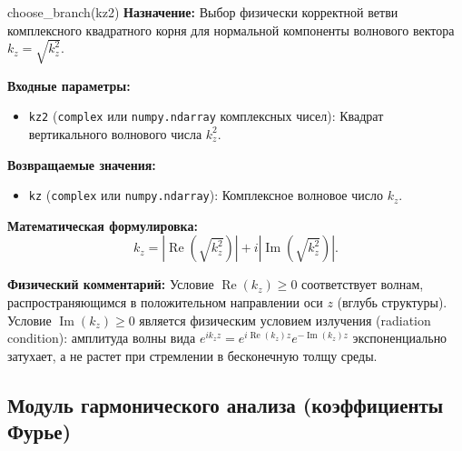 \documentclass[a4paper,11pt]{article}
\begin{document}
\begin{funcbox}{choose\_branch(kz2)}
\textbf{Назначение:} Выбор физически корректной ветви комплексного квадратного корня для нормальной компоненты волнового вектора $k_z = \sqrt{k_z^2}$.

\textbf{Входные параметры:}
\begin{itemize}
    \item \texttt{kz2} (\texttt{complex} или \texttt{numpy.ndarray} комплексных чисел): Квадрат вертикального волнового числа $k_z^2$.
\end{itemize}

\textbf{Возвращаемые значения:}
\begin{itemize}
    \item \texttt{kz} (\texttt{complex} или \texttt{numpy.ndarray}): Комплексное волновое число $k_z$.
\end{itemize}

\textbf{Математическая формулировка:}
\begin{equation*}
k_z = |\operatorname{Re}(\sqrt{k_z^2})| + i |\operatorname{Im}(\sqrt{k_z^2})|.
\end{equation*}

\textbf{Физический комментарий:} Условие $\operatorname{Re}(k_z) \ge 0$ соответствует волнам, распространяющимся в положительном направлении оси $z$ (вглубь структуры). Условие $\operatorname{Im}(k_z) \ge 0$ является физическим условием излучения (radiation condition): амплитуда волны вида $e^{i k_z z} = e^{i \operatorname{Re}(k_z) z} e^{-\operatorname{Im}(k_z) z}$ экспоненциально затухает, а не растет при стремлении в бесконечную толщу среды.
\end{funcbox}

\subsection{Модуль гармонического анализа (коэффициенты Фурье)}
\end{document}
